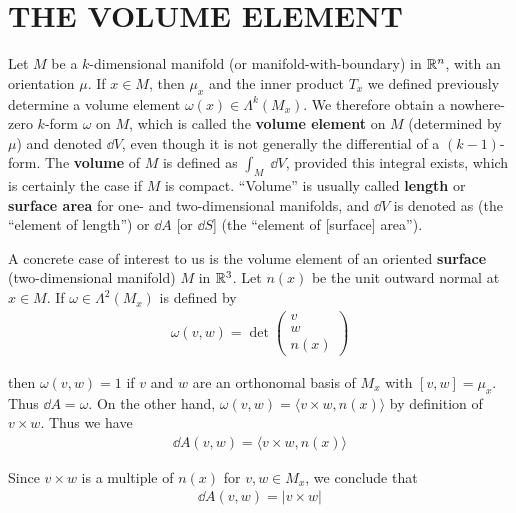 \clearpage
\section{THE VOLUME ELEMENT}
Let $M$ be a $k$-dimensional manifold (or manifold-with-boundary) in $\mathbb{R}^n$, 
with an orientation $\mu$. If $x\in M$, then $\mu_x$ and the inner product $T_x$ we defined 
previously determine a volume element $\omega(x) \in \Lambda^k(M_x)$. We therefore obtain a 
nowhere-zero $k$-form $\omega$ on $M$, which is called the \textbf{volume element} on $M$ 
(determined by $\mu$) and denoted $\dd V$, even though it is not generally the differential 
of a $(k-1)$-form. The \textbf{volume} of $M$ is defined as $\int_M \;\dd V$, provided this integral 
exists, which is certainly the case if $M$ is compact. ``Volume'' is usually called \textbf{length} or 
\textbf{surface area} for one- and two-dimensional manifolds, and $\dd V$ is denoted as 
(the ``element of length'') or 
$\dd A$ [or $\dd S$] (the ``element of [surface] area'').

A concrete case of interest to us is the volume element of an oriented \textbf{surface} 
(two-dimensional manifold) $M$ in $\mathbb{R}^3$. Let $n(x)$ be the unit outward normal at
$x\in M$. If $\omega\in \Lambda^2(M_x)$ is defined by 
\begin{align*}
    \omega(v, w) = \det \begin{pmatrix}v\\ w\\ n(x)\end{pmatrix}
\end{align*} 

then $\omega(v,w)=1$ if $v$ and $w$ are an orthonomal basis of $M_x$ with $[v, w]=\mu_x$. 
Thus $\dd A=\omega$. On the other hand, $\omega(v, w)=\langle v\times w, n(x)\rangle$ by definition
of $v\times w$. Thus we have 
\begin{align*}
    \dd A(v, w) = \langle v\times w, n(x)\rangle
\end{align*}

Since $v\times w$ is a multiple of $n(x)$ for $v,w\in M_x$, we conclude that 
\begin{align*}
    \dd A(v, w) = |v\times w|
\end{align*} 


